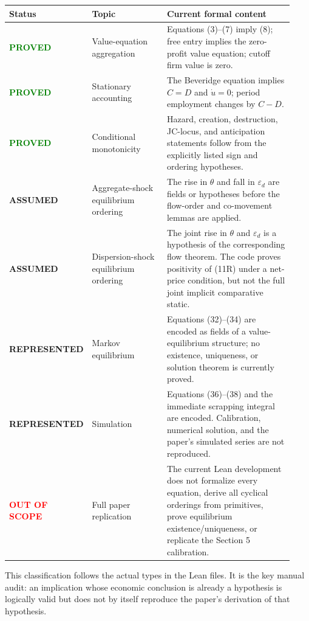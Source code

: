 \documentclass[11pt]{article}
\newcommand{\epsd}{\varepsilon_d}
\newcommand{\status}[2]{\textcolor{#1}{\textbf{#2}}}
\begin{document}
\begin{longtable}{@{}p{0.20\linewidth}p{0.27\linewidth}p{0.46\linewidth}@{}}
\toprule
\textbf{Status} & \textbf{Topic} & \textbf{Current formal content} \\
\midrule
\endhead
\status{green}{PROVED} & Value-equation aggregation & Equations (3)--(7) imply (8);
free entry implies the zero-profit value equation; cutoff firm value is zero. \\
\status{green}{PROVED} & Stationary accounting & The Beveridge equation implies
$C=D$ and $\dot u=0$; period employment changes by $C-D$. \\
\status{green}{PROVED} & Conditional monotonicity & Hazard, creation, destruction,
JC-locus, and anticipation statements follow from the explicitly listed sign and
ordering hypotheses. \\
\status{amber}{ASSUMED} & Aggregate-shock equilibrium ordering & The rise in
$\theta$ and fall in $\epsd$ are fields or hypotheses before the flow-order and
co-movement lemmas are applied. \\
\status{amber}{ASSUMED} & Dispersion-shock equilibrium ordering & The joint rise in
$\theta$ and $\epsd$ is a hypothesis of the corresponding flow theorem. The code
proves positivity of (11R) under a net-price condition, but not the full joint
implicit comparative static. \\
\status{amber}{REPRESENTED} & Markov equilibrium & Equations (32)--(34) are encoded as
fields of a value-equilibrium structure; no existence, uniqueness, or solution theorem
is currently proved. \\
\status{amber}{REPRESENTED} & Simulation & Equations (36)--(38) and the immediate
scrapping integral are encoded. Calibration, numerical solution, and the paper's
simulated series are not reproduced. \\
\status{red}{OUT OF SCOPE} & Full paper replication & The current Lean development
does not formalize every equation, derive all cyclical orderings from primitives,
prove equilibrium existence/uniqueness, or replicate the Section 5 calibration. \\
\bottomrule
\end{longtable}

\newpage
\thispagestyle{fancy}
This classification follows the actual types in the Lean files. It is the key manual
audit: an implication whose economic conclusion is already a hypothesis is logically
valid but does not by itself reproduce the paper's derivation of that hypothesis.
\end{document}
